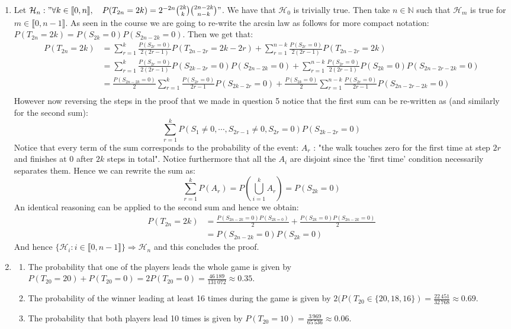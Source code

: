 \documentclass[10pt,a4paper]{article}
\begin{document}
\begin{enumerate}
\item Let $\mathcal{H}_n : "  \forall k \in \llbracket 0, n \rrbracket, \quad P(T_{2n} = 2k) = 2^{-2n} \binom{2k}{k} \binom{2n - 2k}{n - k}"$. We have that $\mathcal{H}_0$ is trivially true. Then take $n \in \mathbb{N} $ such that $\mathcal{H}_m$ is true for $m \in \llbracket 0, n - 1 \rrbracket$. As seen in the course we are going to re-write the arcsin law as follows for more compact notation: $P(T_{2n} = 2k) = P(S_{2k} = 0)P(S_{2n - 2k} = 0)$. Then we get that:
\begin{align*}
P(T_{2n} = 2k) &= \sum_{r = 1}^k \frac{P(S_{2r} = 0)}{2(2r - 1)} P(T_{2n - 2r} = 2k - 2r) + \sum_{r = 1}^{n - k} \frac{P(S_{2r} = 0)}{2(2r - 1)} P(T_{2n - 2r} = 2k)\\
&= \sum_{r = 1}^k \frac{P(S_{2r} = 0)}{2(2r - 1)} P(S_{2k - 2r} = 0)P(S_{2n - 2k} = 0) + \sum_{r = 1}^{n - k} \frac{P(S_{2r} = 0)}{2(2r - 1)} P(S_{2k} = 0)P(S_{2n - 2r - 2k} = 0)\\
&= \frac{P(S_{2n - 2k} = 0)}{2}\sum_{r = 1}^k \frac{P(S_{2r} = 0)}{2r - 1} P(S_{2k - 2r} = 0) + \frac{P(S_{2k} = 0)}{2}\sum_{r = 1}^{n - k} \frac{P(S_{2r} = 0)}{2r - 1} P(S_{2n - 2r - 2k} = 0)\\ 
\end{align*}
However now reversing the steps in the proof that we made in question 5 notice that the first sum can be re-written as (and similarly for the second sum):
\[
\sum_{r = 1}^k P(S_1 \neq 0, \cdots, S_{2r - 1} \neq 0, S_{2r} = 0) P(S_{2 k - 2r} = 0)
\]
Notice that every term of the sum corresponds to the probability of the event: $A_r$ : "the walk touches zero for the first time at step $2r$ and finishes at 0 after $2k$ steps in total". Notice furthermore that all the $A_i$ are disjoint since the 'first time' condition necessarily separates them. Hence we can rewrite the sum as:
\[
\sum_{r = 1}^k P(A_r) = P(\bigcup_{i = 1}^k A_r) = P(S_{2k} = 0)
\]
An identical reasoning can be applied to the second sum and hence we obtain:
\begin{align*}
P(T_{2n} = 2k) &= \frac{P(S_{2n - 2k} = 0)P(S_{2k = 0})}{2} + \frac{P(S_{2k} = 0)P(S_{2n - 2k} = 0)}{2}\\
&= P(S_{2n - 2k} = 0) P(S_{2k} = 0)
\end{align*}
And hence $\{\mathcal{H}_i : i \in \llbracket 0, n- 1 \rrbracket\} \Rightarrow \mathcal{H}_n$ and this concludes the proof.

\item \begin{enumerate}
\item The probability that one of the players leads the whole game is given by $P(T_{20} = 20) + P(T_{20} = 0) = 2P(T_{20} = 0) = \frac{46\,189}{131\,072} \approx 0.35$.  
\item The probability of the winner leading at least 16 times during the game is given  by $2(P(T_{20} \in \{20, 18, 16\}) = \frac{22\,451}{32\,768} \approx 0.69$. 
\item The probability that both players lead 10 times is given by $P(T_{20} = 10) = \frac{3\,969}{65\,536} \approx 0.06$. 
\end{enumerate}


\end{enumerate}
\end{document}

